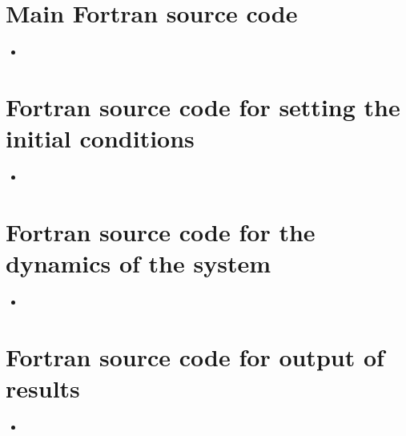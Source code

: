 \documentclass[
10pt, %
a4paper, %
oneside, %
headinclude,footinclude, %
BCOR5mm, %
]{scrartcl}
\newcommand{\insertcode}[2]{\begin{itemize}\item[]\end{itemize}} %
\begin{document}
\begin{appendices}

\section{Main Fortran source code}


\insertcode{"../argon_box.f90"}{argon\_box.f90} %


\newpage


\section{Fortran source code for setting the initial conditions}


\insertcode{"../argon_box_init.f90"}{argon\_box\_init.f90} %


\newpage


\section{Fortran source code for the dynamics of the system}


\insertcode{"../argon_box_dynamics.f90"}{argon\_box\_dynamics.f90} %


\newpage


\section{Fortran source code for output of results}


\insertcode{"../argon_box_results.f90"}{argon\_box\_results.f90} %


\newpage

\end{appendices}
\end{document}
